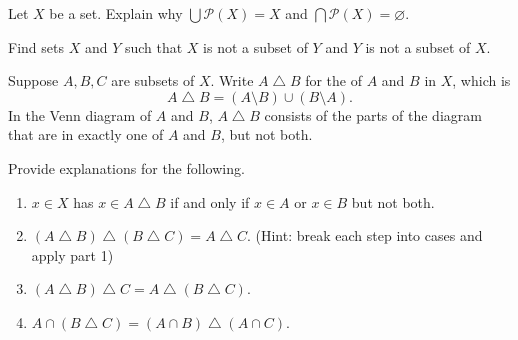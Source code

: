\documentclass[../notes.tex]{subfiles}
\begin{document}
\begin{homework}
    Let $X$ be a set. Explain why $\bigcup \mathcal P(X) = X$ and $\bigcap \mathcal P(X) = \varnothing$.
\end{homework}
\begin{homework}
    Find sets $X$ and $Y$ such that $X$ is not a subset of $Y$ and $Y$ is not a subset of $X$.
\end{homework}
\begin{homework}
    Suppose $A, B, C$ are subsets of $X$. Write $A \operatorname{\triangle} B$ for the  of $A$ and $B$ in $X$, which is
    $$A \operatorname{\triangle} B = (A \setminus B) \cup (B \setminus A).$$
    In the Venn diagram of $A$ and $B$, $A \operatorname{\triangle} B$ consists of the parts of the diagram that are in exactly one of $A$ and $B$, but not both.
    
    Provide explanations for the following.
    \begin{enumerate}[label=(\alph*)]
        \item $x \in X$ has $x \in A \operatorname{\triangle} B$ if and only if $x \in A$ or $x \in B$ but not both.
        \item $(A \operatorname{\triangle} B) \operatorname{\triangle} {(B \operatorname{\triangle} C)} = A \operatorname{\triangle} C$. (Hint: break each step into cases and apply part 1)
        \item $(A \operatorname{\triangle} B)\operatorname{\triangle}C=A\operatorname{\triangle}{}(B\operatorname{\triangle}C)$.
        \item $A\cap(B\operatorname{\triangle}C)=(A\cap B)\operatorname{\triangle}{}(A\cap C)$.
    \end{enumerate}
\end{homework}
\end{document}
